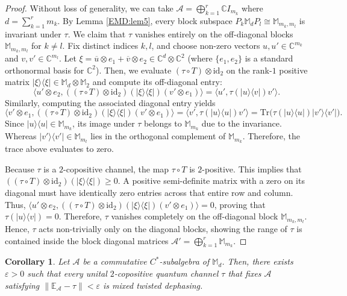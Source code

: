 \documentclass[11pt,reqno]{amsart}
\theoremstyle{definition}
\theoremstyle{plain}
\newtheorem{cor}[defn]{Corollary}
\theoremstyle{remark}
\newcommand{\la}{\langle}
\newcommand{\ra}{\rangle}
\numberwithin{equation}{section}%
\begin{document}
 
 \begin{proof}
 	Without loss of generality, we can take $ \mathcal{A} = \bigoplus_{k=1}^r \mathbb{C}I_{m_k}$ where $d = \sum_{k=1}^r m_k$. By Lemma \ref{EMD:lem5}, every block subspace $P_k \mathbb{M}_d P_l \cong \mathbb{M}_{m_k,m_l}$ is invariant under $\tau$. We claim that $\tau$ vanishes entirely on the off-diagonal blocks $\mathbb{M}_{m_k,m_l}$ for $k \neq l$. Fix distinct indices $k, l$, and choose non-zero vectors $u, u'\in \mathbb{C}^{m_k}$ and $v,v'\in \mathbb{C}^{m_l}$. Let $\xi=\overline{u}\otimes e_1+\overline{v}\otimes e_2\in\mathbb{C}^d\otimes \mathbb{C}^2$ (where $\{e_1,e_2\}$ is a standard orthonormal basis for $\mathbb{C}^2$). Then, we evaluate $(\tau\circ T)\otimes\text{id}_{2}$ on the rank-$1$ positive matrix $|\xi\ra\la\xi|\in \mathbb{M}_d\otimes \mathbb{M}_2$ and compute its off-diagonal entry:
 	\[
 	\la u'\otimes e_2,((\tau\circ T)\otimes\text{id}_{2})(|\xi\ra\la\xi|)(v'\otimes e_1)\ra=\la u',\tau(|u\ra\la v|)v'\ra.
 	\]
 	Similarly, computing the associated diagonal entry yields
 	\[
 	\langle v'\otimes e_1, ((\tau\circ T)\otimes\text{id}_{2})(|\xi\ra\la\xi|)(v'\otimes e_1) \rangle = \langle v', \tau(|u\rangle\langle u|) v' \rangle = \text{Tr}\big(\tau(|u\rangle\langle u|)|v'\rangle\langle v'|\big).
 	\]
 	Since $|u\rangle\langle u| \in \mathbb{M}_{m_k}$, its image under $\tau$ belongs to $\mathbb{M}_{m_k}$ due to the invariance. Whereas $|v'\rangle\langle v'| \in \mathbb{M}_{m_l}$ lies in the orthogonal complement of $\mathbb{M}_{m_k}$. Therefore, the trace above evaluates to zero.
 	
 	
 	Because $\tau$ is a $2$-copositive channel, the map $\tau \circ T$ is $2$-positive. This implies that $((\tau\circ T)\otimes\text{id}_{2})(|\xi\ra\la\xi|) \ge 0$. A positive semi-definite matrix with a zero on its diagonal must have identically zero entries across that entire row and column. Thus, $\la u'\otimes e_2,((\tau\circ T)\otimes\text{id}_{2})(|\xi\ra\la\xi|)(v'\otimes e_1)\ra = 0$, proving that $\tau(|u\rangle\langle v|) = 0$. Therefore, $\tau$ vanishes completely on the off-diagonal block $\mathbb{M}_{m_k,m_l}$. Hence, $\tau$ acts non-trivially only on the diagonal blocks, showing the range of $\tau$ is contained inside the block diagonal matrices $\mathcal{A}'=\bigoplus_{k=1}^r \mathbb{M}_{m_k}$.
 \end{proof}
 
 
 
 \begin{cor}
 	Let $\mathcal{A}$ be a commutative $C^*$-subalgebra of $\mathbb{M}_d$. Then, there exists $\varepsilon>0$ such that every unital $2$-copositive quantum channel $\tau$ that fixes $\mathcal{A}$ satisfying $\|\mathbb{E}_{\mathcal{A}}-\tau\|<\varepsilon$ is mixed twisted dephasing.
 \end{cor}
 
\end{document}

